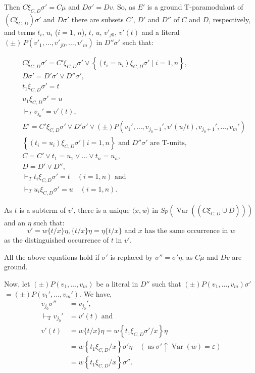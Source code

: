 \documentclass[letterpaper]{report}
\begin{document}
Then $C\xi_{C,D}\sigma'=C\mu$ and $D\sigma'=Dv$. So,
as $E'$ is a ground $\mathrm{T}$-paramodulant of
$(C\xi_{C,D})\sigma'$ and $D\sigma'$ there are
subsets $C'$, $D'$ and $D''$ of $C$ and
$D$, respectively, and terms $t_{i}$, $u_{i}$ ($i=1$, $n$),
$t$, $u$, $v'_{j0}$, $v'(t)$ and a literal
$(\pm)\,P(v'_{1},\ldots,v'_{j0},\ldots,v'_{m})$
in $D''\sigma'$ such that:

$$
\begin{aligned}
	& C \xi_{C, D} \sigma'=C' \xi_{C, D} \sigma' \vee\left\{\left(t_i=u_i\right) \xi_{C, D} \sigma' \mid i=1, n\right\}, \\
	& D \sigma'=D' \sigma' \vee D'' \sigma', \\
	& t_1 \xi_{C, D} \sigma'=t \\
	& u_1 \xi_{C, D} \sigma'=u \\
	& \vdash_T v_{j_0}'=v'(t), \\
	& E'=C' \xi_{C, D} \sigma' \vee D' \sigma' \vee( \pm) P\left(v_1', \ldots, v_{j_0 - 1}', v'(u / t), v_{j_0+1}', \ldots, v_m'\right) \\
	& \left\{\left(t_i=u_i\right) \xi_{C, D} \sigma' \mid i=1, n\right\} \text { and } D'' \sigma' \text { are } \mathrm{T}\text{-units, } \\
	& C=C' \vee t_1=u_1 \vee \ldots \vee t_n=u_n, \\
	& D=D' \vee D'', \\
	& \vdash_T t_i \xi_{C, D} \sigma'=t \quad(i=1, n) \text { and } \\
	& \vdash_T u_i \xi_{C, D} \sigma'=u \quad(i=1, n) .
\end{aligned}
$$

As $t$ is a subterm of $v'$, there is a unique $\langle x, w\rangle$ in ${Sp}\left(\operatorname{Var}\left(\left(C \xi_{C, D} \cup D\right)\right)\right)$ and an $\eta$ such that:
$$
v'=w\{t / x\} \eta,\{t / x\} \eta=\eta\{t / x\} \text { and } x \text { has the same occurrence in } w
$$
as the distinguished occurrence of $t$ in $v'$.

All the above equations hold if $\sigma'$ is replaced by $\sigma''=\sigma' \eta$, as $C \mu$ and $D v$ are ground.

Now, let $( \pm) P\left(v_1, \ldots, v_m\right)$ be a literal in $D''$ such that $( \pm) P\left(v_1, \ldots, v_m\right) \sigma'$ $=( \pm) P\left(v_1', \ldots, v_m'\right)$. We have,
$$
\begin{aligned}
	v_{j_0} \sigma'' & =v_{j_0}', \\
	\vdash_{\mathrm{T}} v_{j_0}' & =v'(t) \text { and } \\
	v'(t) & =w\{t / x\} \eta=w\left\{t_1 \xi_{C, D} \sigma' / x\right\} \eta \\
	& =w\left\{t_1 \xi_{C, D} / x\right\} \sigma' \eta \quad\left(\operatorname{as} \sigma' \uparrow \operatorname{Var}(w)=\varepsilon\right) \\
	& =w\left\{t_1 \xi_{C, D} / x\right\} \sigma'' .
\end{aligned}
$$
\end{document}
